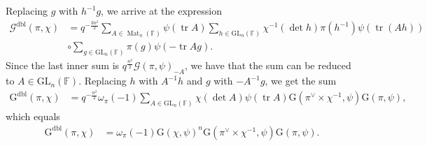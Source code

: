 \documentclass[12pt, reqno]{amsart}
\theoremstyle{definition}
\theoremstyle{definition}
\theoremstyle{definition}
\newcommand{\fieldCharacter}{\psi}
\newcommand{\centralCharacter}[1]{\omega_{#1}}
\newcommand{\Contragradient}[1]{#1^{\vee}}
\newcommand{\trace}{\operatorname{tr}}
\newcommand{\GL}{\mathrm{GL}}
\newcommand{\finiteField}{\mathbb{F}}
\newcommand{\squareMatrix}{\operatorname{Mat}}
\newcommand{\GaussSum}[2]{\mathcal{G}\left(#1, #2\right)}
\newcommand{\dblGaussSum}[2]{\mathcal{G}^{\mathrm{dbl}}\left(#1, #2\right)}
\newcommand{\GaussSumScalar}[2]{\mathrm{G}\left(#1, #2\right)}
\newcommand{\dblGaussSumScalar}[2]{\mathrm{G}^{\mathrm{dbl}}\left(#1, #2\right)}
\begin{document}
Replacing $g$ with $h^{-1} g$, we arrive at the expression
\begin{align*}
	\dblGaussSum{\pi}{\chi} &= q^{-\frac{3n^2}{2}} \sum_{A \in \squareMatrix_n\left(\finiteField\right)} \fieldCharacter\left(\trace A\right) \sum_{h \in \GL_n\left(\finiteField\right)} \chi^{-1}\left(\det h\right) \pi\left(h^{-1}\right) \fieldCharacter\left(\trace\left(Ah\right)\right)\\
	& \circ \sum_{g \in \GL_n\left(\finiteField\right)} \pi\left(g\right) \fieldCharacter\left(-\trace Ag\right).
\end{align*}
Since the last inner sum is $q^{\frac{n^2}{2}} \GaussSum{\pi}{\fieldCharacter}_{-A}$, we have that the sum can be reduced to $A \in \GL_n\left(\finiteField\right)$. Replacing $h$ with $A^{-1} h$ and $g$ with $-A^{-1} g$, we get the sum
\begin{align*}
	\dblGaussSumScalar{\pi}{\chi} &= q^{-\frac{n^2}{2}} \centralCharacter{\pi}\left(-1\right) \sum_{A \in \GL_n\left(\finiteField\right)} \chi\left(\det A\right) \fieldCharacter\left(\trace A\right) \GaussSumScalar{\Contragradient{\pi} \times \chi^{-1}}{\fieldCharacter} \GaussSumScalar{\pi}{\fieldCharacter},
\end{align*}
which equals
\begin{align*}
	\dblGaussSumScalar{\pi}{\chi} &=  \centralCharacter{\pi}\left(-1\right) \GaussSumScalar{\chi}{\fieldCharacter}^n \GaussSumScalar{\Contragradient{\pi} \times \chi^{-1}}{\fieldCharacter} \GaussSumScalar{\pi}{\fieldCharacter}.
\end{align*}




\end{document}
